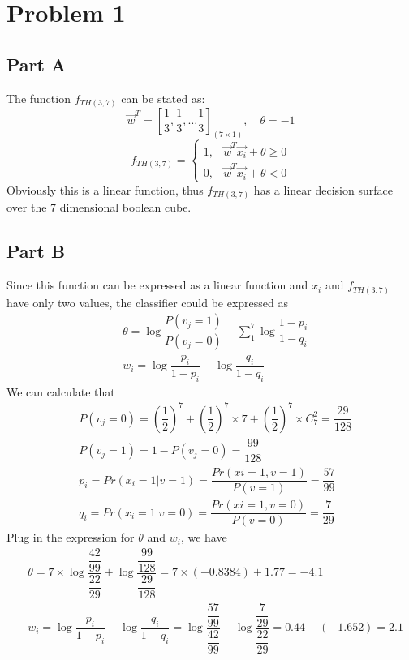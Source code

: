 

\usepackage{amsmath}
\oddsidemargin 0in
\evensidemargin 0in
\textwidth 6.5in
\topmargin -0.5in
\textheight 9.0in




\pagestyle{myheadings}  %

\section{Problem 1}
\subsection{Part A}
The function $f_{TH(3,7)}$ can be stated as: \[\vec{w}^T=[\dfrac{1}{3},\dfrac{1}{3},\ldots \dfrac{1}{3}]_{(7\times 1)},\quad \theta=-1 \] 
\begin{equation*}
f_{TH(3,7)}= \left\{
\begin{array}{cc}
1, & \vec{w}^T \vec{x_i} + \theta \geq 0\\
0, & \vec{w}^T \vec{x_i} + \theta < 0
\end{array}
\right. \label{eq:separable}
\end{equation*}
Obviously this is a linear function, thus $f_{TH(3,7)}$ has a linear decision surface over the 7 dimensional boolean cube. 

\subsection{Part B}
Since this function can be expressed as a linear function and $x_i$ and $f_{TH(3,7)}$ have only two values, the classifier could be expressed as 
\begin{align*}
& \theta=\log{\dfrac{P(v_j=1)}{P(v_j=0)}}+\sum_1^7\log\dfrac{1-p_i}{1-q_i} \\ 
& w_i=\log\dfrac{p_i}{1-p_i}-\log\dfrac{q_i}{1-q_i}
\end{align*}
We can calculate that 
\begin{align*}
& P(v_j=0)={(\dfrac{1}{2})}^7+{(\dfrac{1}{2})}^7\times7+{(\dfrac{1}{2})}^7\times C_7^2=\dfrac{29}{128} \\
& P(v_j=1)=1-P(v_j=0)=\dfrac{99}{128}\\
& p_i=Pr(x_i=1|v=1)=\dfrac{Pr(xi=1,v=1)}{P(v=1)}=\dfrac{57}{99}\\
& q_i=Pr(x_i=1|v=0)=\dfrac{Pr(xi=1,v=0)}{P(v=0)}=\dfrac{7}{29}
\end{align*}
Plug in the expression for $\theta$ and $w_i$, we have 
\begin{align*}
& \theta=7\times \log{\dfrac{\dfrac{42}{99}}{\dfrac{22}{29}}}+\log{\dfrac{\dfrac{99}{128}}{\dfrac{29}{128}}}=7\times (-0.8384)+1.77=-4.1 \\
& w_i=\log\dfrac{p_i}{1-p_i}-\log\dfrac{q_i}{1-q_i}=\log\dfrac{\dfrac{57}{99}}{\dfrac{42}{99}}-\log\dfrac{\dfrac{7}{29}}{\dfrac{22}{29}}=0.44-(-1.652)=2.1
\end{align*}

